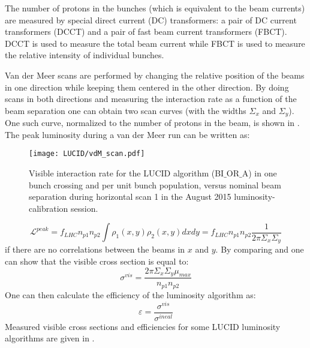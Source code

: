 The number of protons in the bunches (which is equivalent to the beam currents) are measured by special direct current (DC) transformers: 
a pair of DC current transformers (DCCT) and a pair of fast beam current transformers (FBCT). 
DCCT is used to measure the total beam current while FBCT is used to measure the relative intensity of individual bunches.

Van der Meer scans are performed by changing the relative position of the beams in one direction while keeping them centered in the other direction.
By doing scans in both directions and measuring the interaction rate as a function of the beam separation one can obtain two scan curves (with the widths $\Sigma_{x}$ and $\Sigma_{y}$). 
One such curve, normalized to the number of protons in the beam, is shown in .
The peak luminosity during a van der Meer run can be written as:
\begin{figure}
\centering
\texttt{[image: LUCID/vdM\_scan.pdf]}
\caption{Visible interaction rate for the LUCID algorithm (BI$\_$OR$\_$A) in one bunch crossing and per unit bunch population, 
	 versus nominal beam separation during horizontal scan 1 in the August 2015 luminosity-calibration session. }
\label{fig:vdmScanCurve}
\end{figure}
\begin{equation}
\mathscr{L}^{peak} = f_{LHC} n_{p1} n_{p2} \int \rho_{1}(x,y) \rho_{2}(x,y) dx dy =  f_{LHC} n_{p1} n_{p2} \dfrac{1}{2\pi \Sigma_{x} \Sigma_{y}}
\label{eq:lumi_vdm}
\end{equation}
if there are no correlations between the beams in $x$ and $y$.
By comparing  and  one can show that the visible cross section is equal to:
\begin{equation}
\sigma^{vis} = \dfrac{ 2 \pi \Sigma_{x} \Sigma_{y} \mu_{max}  }{ n_{p1} n_{p2} }
\label{eq:sigma_vis}
\end{equation}
One can then calculate the efficiency of the luminosity algorithm as:
\begin{equation}
\varepsilon = \dfrac{\sigma^{vis}}{\sigma^{ineal}}
\label{eq:alg_method_eff}
\end{equation}
Measured visible cross sections and efficiencies for some LUCID luminosity algorithms are given in .
% 

